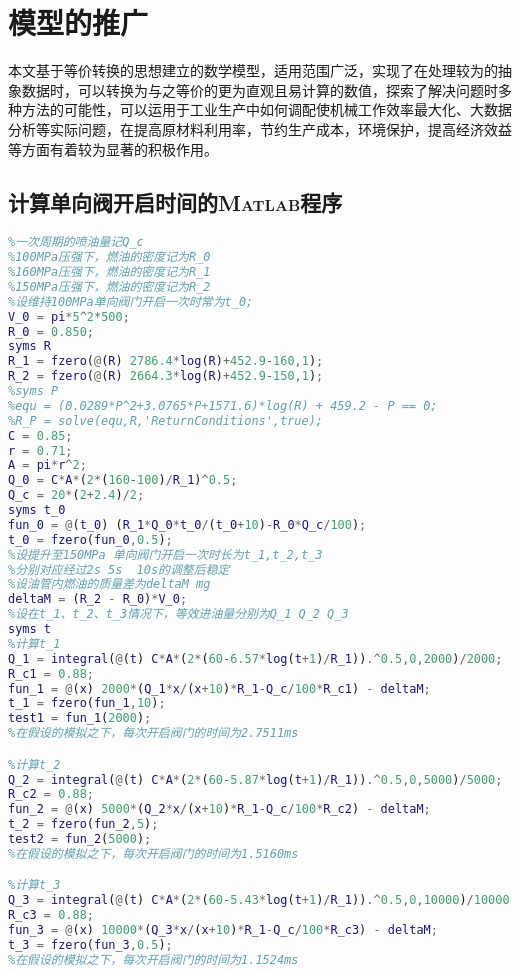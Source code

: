 \documentclass[withoutpreface,bwprint]{cumcmthesis} %
\begin{document}
\section{模型的推广}
本文基于等价转换的思想建立的数学模型，适用范围广泛，实现了在处理较为的抽象数据时，可以转换为与之等价的更为直观且易计算的数值，探索了解决问题时多种方法的可能性，可以运用于工业生产中如何调配使机械工作效率最大化、大数据分析等实际问题，在提高原材料利用率，节约生产成本，环境保护，提高经济效益等方面有着较为显著的积极作用。
\newpage


\newpage
\begin{appendices}
\section{计算单向阀开启时间的\textsc{Matlab}程序}
\begin{lstlisting}[language=matlab]
%高压油管的容积为V_0
%一次周期的喷油量记Q_c
%100MPa压强下，燃油的密度记为R_0
%160MPa压强下，燃油的密度记为R_1
%150MPa压强下，燃油的密度记为R_2
%设维持100MPa单向阀门开启一次时常为t_0;
V_0 = pi*5^2*500;
R_0 = 0.850;
syms R
R_1 = fzero(@(R) 2786.4*log(R)+452.9-160,1);
R_2 = fzero(@(R) 2664.3*log(R)+452.9-150,1);
%syms P
%equ = (0.0289*P^2+3.0765*P+1571.6)*log(R) + 459.2 - P == 0;
%R_P = solve(equ,R,'ReturnConditions',true);
C = 0.85;
r = 0.71;
A = pi*r^2;
Q_0 = C*A*(2*(160-100)/R_1)^0.5;
Q_c = 20*(2+2.4)/2;
syms t_0
fun_0 = @(t_0) (R_1*Q_0*t_0/(t_0+10)-R_0*Q_c/100);
t_0 = fzero(fun_0,0.5);
%设提升至150MPa 单向阀门开启一次时长为t_1,t_2,t_3
%分别对应经过2s 5s  10s的调整后稳定
%设油管内燃油的质量差为deltaM mg
deltaM = (R_2 - R_0)*V_0;
%设在t_1、t_2、t_3情况下，等效进油量分别为Q_1 Q_2 Q_3
syms t
%计算t_1
Q_1 = integral(@(t) C*A*(2*(60-6.57*log(t+1)/R_1)).^0.5,0,2000)/2000;
R_c1 = 0.88;
fun_1 = @(x) 2000*(Q_1*x/(x+10)*R_1-Q_c/100*R_c1) - deltaM;
t_1 = fzero(fun_1,10);
test1 = fun_1(2000);
%在假设的模拟之下，每次开启阀门的时间为2.7511ms

%计算t_2
Q_2 = integral(@(t) C*A*(2*(60-5.87*log(t+1)/R_1)).^0.5,0,5000)/5000;
R_c2 = 0.88;
fun_2 = @(x) 5000*(Q_2*x/(x+10)*R_1-Q_c/100*R_c2) - deltaM;
t_2 = fzero(fun_2,5);
test2 = fun_2(5000);
%在假设的模拟之下，每次开启阀门的时间为1.5160ms

%计算t_3
Q_3 = integral(@(t) C*A*(2*(60-5.43*log(t+1)/R_1)).^0.5,0,10000)/10000;
R_c3 = 0.88;
fun_3 = @(x) 10000*(Q_3*x/(x+10)*R_1-Q_c/100*R_c3) - deltaM;
t_3 = fzero(fun_3,0.5);
%在假设的模拟之下，每次开启阀门的时间为1.1524ms



\end{lstlisting}
\end{appendices}
\end{document}
